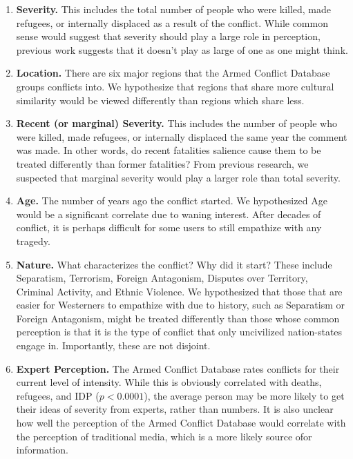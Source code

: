 \begin{enumerate}
\item{\textbf{Severity.} This includes the total number of people who were killed, made refugees, or internally displaced as a result of the conflict. While common sense would suggest that severity should play a large role in perception, previous work suggests that it doesn't play as large of one as one might think.} 
\item {\textbf{Location.} There are six major regions that the Armed Conflict Database groups conflicts into. We hypothesize that regions that share more cultural similarity would be viewed differently than regions which share less.} 
\item {\textbf{Recent (or marginal) Severity.} This includes the number of people who were killed, made refugees, or internally displaced the same year the comment was made. In other words, do recent fatalities salience cause them to be treated differently than former fatalities? From previous research, we suspected that marginal severity would play a larger role than total severity.}
\item {\textbf{Age.} The number of years ago the conflict started. We hypothesized Age would be a significant correlate due to waning interest. After decades of conflict, it is perhaps difficult for some users to still empathize with any tragedy.}
\item {\textbf{Nature.} What characterizes the conflict? Why did it start? These include Separatism, Terrorism, Foreign Antagonism, Disputes over Territory, Criminal Activity, and Ethnic Violence. We hypothesized that those that are easier for Westerners to empathize with due to history, such as Separatism or Foreign Antagonism, might be treated differently than those whose common perception is that it is the type of conflict that only uncivilized nation-states engage in. Importantly, these are not disjoint.}
\item {\textbf{Expert Perception.} The Armed Conflict Database rates conflicts for their current level of intensity. While this is obviously correlated with deaths, refugees, and IDP ($p < 0.0001$), the average person may be more likely to get their ideas of severity from experts, rather than numbers. It is also unclear how well the perception of the Armed Conflict Database would correlate with the perception of traditional media, which is a more likely source ofor information.} 
\end{enumerate}